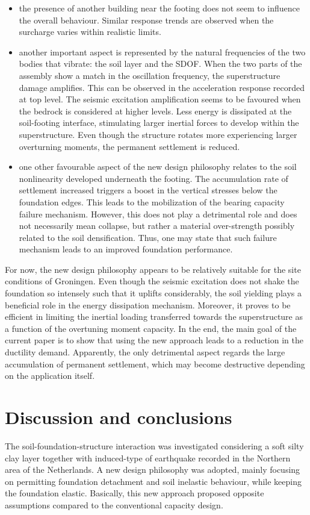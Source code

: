 \begin{itemize}
	\item the presence of another building near the footing does not seem to influence the overall behaviour. Similar response trends are observed when the surcharge varies within realistic limits.
	\item another important aspect is represented by the natural frequencies of the two bodies that vibrate: the soil layer and the SDOF. When the two parts of the assembly show a match in the oscillation frequency, the superstructure damage amplifies. This can be observed in the acceleration response recorded at top level. The seismic excitation amplification seems to be favoured when the bedrock is considered at higher levels. Less energy is dissipated at the soil-footing interface, stimulating larger inertial forces to develop within the superstructure. Even though the structure rotates more experiencing larger overturning moments, the permanent settlement is reduced.
	\item one other favourable aspect of the new design philosophy relates to the soil nonlinearity developed underneath the footing. The accumulation rate of settlement increased triggers a boost in the vertical stresses below the foundation edges. This leads to the mobilization of the bearing capacity failure mechanism. However, this does not play a detrimental role and does not necessarily mean collapse, but rather a material over-strength possibly related to the soil densification. Thus, one may state that such failure mechanism leads to an improved foundation performance.
\end{itemize}


For now, the new design philosophy appears to be relatively suitable for the site conditions of Groningen. Even though the seismic excitation does not shake the foundation so intensely such that it uplifts considerably, the soil yielding plays a beneficial role in the energy dissipation mechanism. Moreover, it proves to be efficient in limiting the inertial loading transferred towards the superstructure as a function of the overtuning moment capacity. In the end, the main goal of the current paper is to show that using the new approach leads to a reduction in the ductility demand. Apparently, the only detrimental aspect regards the large accumulation of permanent settlement, which may become destructive depending on the application itself.

\newpage
\chapter{Discussion and conclusions}
The soil-foundation-structure interaction was investigated considering a soft silty clay layer together with induced-type of earthquake recorded in the Northern area of the Netherlands. A new design philosophy was adopted, mainly focusing on permitting foundation detachment and soil inelastic behaviour, while keeping the foundation elastic. Basically, this new approach proposed opposite assumptions compared to the conventional capacity design.

